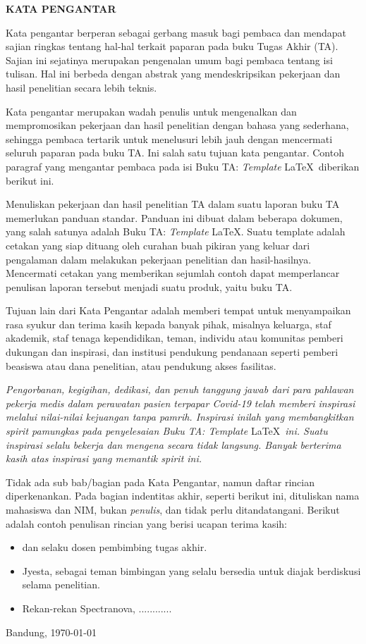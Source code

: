 \clearpage
{}
{}
\begin{center}
 \textbf{\large KATA PENGANTAR}\\[3em]
\end{center}

\noindent Kata pengantar berperan sebagai gerbang masuk bagi pembaca dan mendapat sajian ringkas tentang hal-hal terkait paparan pada buku Tugas Akhir (TA). Sajian ini sejatinya merupakan pengenalan umum bagi pembaca tentang isi tulisan. Hal ini berbeda dengan abstrak yang mendeskripsikan pekerjaan dan hasil penelitian secara lebih teknis.

Kata pengantar merupakan wadah penulis untuk mengenalkan dan mempromosikan pekerjaan dan hasil penelitian dengan bahasa yang sederhana, sehingga pembaca tertarik untuk menelusuri lebih jauh dengan mencermati seluruh paparan pada buku TA. Ini salah satu tujuan kata pengantar. Contoh paragraf yang mengantar pembaca pada isi Buku TA: \textit{Template} \LaTeX\ diberikan berikut ini.

Menuliskan pekerjaan dan hasil penelitian TA dalam suatu laporan buku TA memerlukan panduan standar. Panduan ini dibuat dalam beberapa dokumen, yang salah satunya adalah Buku TA: \textit{Template} \LaTeX. Suatu template adalah cetakan yang siap dituang oleh curahan buah pikiran yang keluar dari pengalaman dalam melakukan pekerjaan penelitian dan hasil-hasilnya. Mencermati cetakan yang memberikan sejumlah contoh dapat memperlancar penulisan laporan tersebut menjadi suatu produk, yaitu buku TA.

Tujuan lain dari Kata Pengantar adalah memberi tempat untuk menyampaikan rasa syukur dan terima kasih kepada banyak pihak, misalnya keluarga, staf akademik, staf tenaga kependidikan, teman, individu atau komunitas pemberi dukungan dan inspirasi, dan institusi pendukung pendanaan seperti pemberi beasiswa atau dana penelitian, atau pendukung akses fasilitas.

\textit{Pengorbanan, kegigihan, dedikasi, dan penuh tanggung jawab dari para pahlawan pekerja medis dalam perawatan pasien terpapar Covid-19 telah memberi inspirasi melalui nilai-nilai kejuangan tanpa pamrih. Inspirasi inilah yang membangkitkan spirit pamungkas pada penyelesaian Buku TA: Template} \LaTeX\ \textit{ini. Suatu inspirasi selalu bekerja dan mengena secara tidak langsung. Banyak berterima kasih atas inspirasi yang memantik spirit ini.}

\newpage
Tidak ada sub bab/bagian pada Kata Pengantar, namun daftar rincian diperkenankan. Pada bagian indentitas akhir, seperti berikut ini, dituliskan nama mahasiswa dan NIM, bukan \textit{penulis}, dan tidak perlu ditandatangani. Berikut adalah contoh penulisan rincian yang berisi ucapan terima kasih:
\begin{itemize}
 \item \pembimbingsatu dan \pembimbingdua selaku dosen pembimbing tugas akhir.
 \item Jyesta, sebagai teman bimbingan yang selalu bersedia untuk diajak berdiskusi selama penelitian.
 \item Rekan-rekan Spectranova, ............
\end{itemize}

\begin{flushright}
Bandung, \today\\[0.25cm]
\penulis \\
\nim
\end{flushright}
